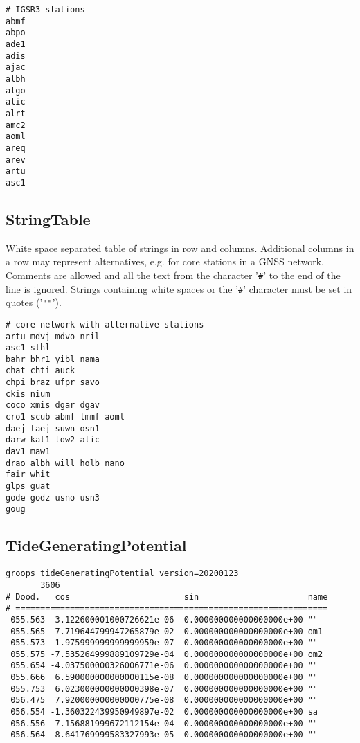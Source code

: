 \begin{verbatim}
# IGSR3 stations
abmf
abpo
ade1
adis
ajac
albh
algo
alic
alrt
amc2
aoml
areq
arev
artu
asc1
\end{verbatim}


\subsection{StringTable}\label{general.fileFormat:stringTable}
White space separated table of strings in row and columns.
Additional columns in a row may represent alternatives, e.g. for core stations in a GNSS network.
Comments are allowed and all the text from the character '\verb|#|' to the end of the line is ignored.
Strings containing white spaces or the '\verb|#|' character must be set in quotes  ('\verb|""|').

\begin{verbatim}
# core network with alternative stations
artu mdvj mdvo nril
asc1 sthl
bahr bhr1 yibl nama
chat chti auck
chpi braz ufpr savo
ckis nium
coco xmis dgar dgav
cro1 scub abmf lmmf aoml
daej taej suwn osn1
darw kat1 tow2 alic
dav1 maw1
drao albh will holb nano
fair whit
glps guat
gode godz usno usn3
goug
\end{verbatim}


\subsection{TideGeneratingPotential}\label{general.fileFormat:tideGeneratingPotential}

\begin{verbatim}
groops tideGeneratingPotential version=20200123
       3606
# Dood.   cos                       sin                      name
# ===============================================================
 055.563 -3.122600001000726621e-06  0.000000000000000000e+00 ""
 055.565  7.719644799947265879e-02  0.000000000000000000e+00 om1
 055.573  1.975999999999999959e-07  0.000000000000000000e+00 ""
 055.575 -7.535264999889109729e-04  0.000000000000000000e+00 om2
 055.654 -4.037500000326006771e-06  0.000000000000000000e+00 ""
 055.666  6.590000000000000115e-08  0.000000000000000000e+00 ""
 055.753  6.023000000000000398e-07  0.000000000000000000e+00 ""
 056.475  7.920000000000000775e-08  0.000000000000000000e+00 ""
 056.554 -1.360322439950949897e-02  0.000000000000000000e+00 sa
 056.556  7.156881999672112154e-04  0.000000000000000000e+00 ""
 056.564  8.641769999583327993e-05  0.000000000000000000e+00 ""
\end{verbatim}



